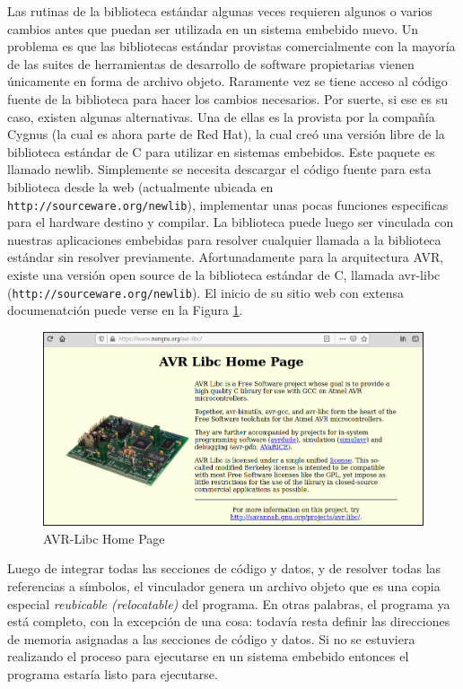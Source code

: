 \documentclass[output=paper, 
colorlinks,
citecolor=brown,
newtxmath
]{langscibook}
\begin{document}
Las rutinas de la biblioteca estándar algunas veces requieren 
algunos o varios cambios antes que puedan ser utilizada en un sistema 
embebido nuevo.
Un problema es que las bibliotecas estándar provistas comercialmente
con la mayoría de las 
suites de herramientas de desarrollo de software propietarias
vienen únicamente en forma de archivo objeto.
Raramente vez se tiene acceso al código fuente de la biblioteca para hacer los 
cambios necesarios. Por suerte, si ese es su caso, existen algunas 
alternativas. Una de ellas es
la provista por la compañía Cygnus (la cual es ahora parte de Red Hat),
la cual creó una versión libre de la biblioteca estándar de C para utilizar 
en sistemas embebidos.
Este paquete es llamado newlib. Simplemente se necesita descargar el código fuente
para esta biblioteca desde la web (actualmente ubicada en 
\texttt{http://sourceware.org/newlib}),
implementar unas pocas funciones especificas para el hardware destino y compilar.
La biblioteca puede luego ser vinculada con nuestras aplicaciones embebidas
para resolver cualquier llamada a la biblioteca estándar sin 
resolver previamente. Afortunadamente para la arquitectura AVR, existe 
una versión open source de la biblioteca estándar de C, llamada avr-libc
(\texttt{http://sourceware.org/newlib}). El inicio de su sitio web
con extensa documenatción puede verse en la Figura \ref{fig:avr_libc}.


\begin{figure}[H]
\includegraphics[width=12cm]{images/avr-libc.png}
\caption{AVR-Libc Home Page}
\label{fig:avr_libc}
\end{figure}


Luego de integrar todas las secciones de código y datos, y de resolver todas
las referencias a símbolos, el vinculador genera un archivo objeto que es
una copia especial \textit{reubicable (relocatable)} del programa. 
En otras palabras,
el programa ya está completo, con la excepción de una cosa: todavía
resta definir las direcciones de memoria asignadas a las secciones de código y 
datos. Si no se estuviera realizando el proceso para ejecutarse en un 
sistema embebido entonces el programa estaría listo para ejecutarse.
\end{document}
